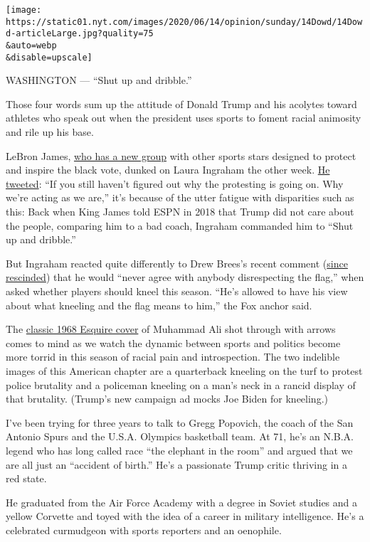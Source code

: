 \texttt{[image: https://static01.nyt.com/images/2020/06/14/opinion/sunday/14Dowd/14Dowd-articleLarge.jpg?quality=75\\\&auto=webp\\\&disable=upscale]}

WASHINGTON --- ``Shut up and dribble.''

Those four words sum up the attitude of Donald Trump and his acolytes
toward athletes who speak out when the president uses sports to foment
racial animosity and rile up his base.

LeBron James,
\href{https://www.nytimes.com/2020/06/10/us/politics/lebron-james-voting-rights.html}{who
has a new group} with other sports stars designed to protect and inspire
the black vote, dunked on Laura Ingraham the other week.
\href{https://twitter.com/KingJames/status/1268616817544531969}{He
tweeted}: ``If you still haven't figured out why the protesting is going
on. Why we're acting as we are,'' it's because of the utter fatigue with
disparities such as this: Back when King James told ESPN in 2018 that
Trump did not care about the people, comparing him to a bad coach,
Ingraham commanded him to ``Shut up and dribble.''

But Ingraham reacted quite differently to Drew Brees's recent comment
(\href{https://www.instagram.com/p/CBE4y_9Hj2S/}{since rescinded}) that
he would ``never agree with anybody disrespecting the flag,'' when asked
whether players should kneel this season. ``He's allowed to have his
view about what kneeling and the flag means to him,'' the Fox anchor
said.

The
\href{https://classic.esquire.com/article/1968/4/1/muhammad-ali}{classic
1968 Esquire cover} of Muhammad Ali shot through with arrows comes to
mind as we watch the dynamic between sports and politics become more
torrid in this season of racial pain and introspection. The two
indelible images of this American chapter are a quarterback kneeling on
the turf to protest police brutality and a policeman kneeling on a man's
neck in a rancid display of that brutality. (Trump's new campaign ad
mocks Joe Biden for kneeling.)

I've been trying for three years to talk to Gregg Popovich, the coach of
the San Antonio Spurs and the U.S.A. Olympics basketball team. At 71,
he's an N.B.A. legend who has long called race ``the elephant in the
room'' and argued that we are all just an ``accident of birth.'' He's a
passionate Trump critic thriving in a red state.

He graduated from the Air Force Academy with a degree in Soviet studies
and a yellow Corvette and toyed with the idea of a career in military
intelligence. He's a celebrated curmudgeon with sports reporters and an
oenophile.

